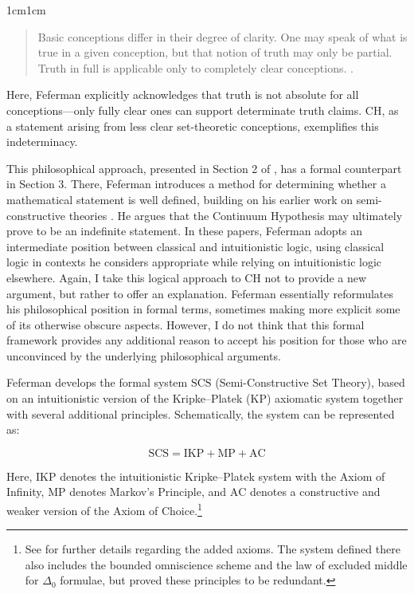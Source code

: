 \documentclass[11pt,a4paper]{book}
\theoremstyle{plain}
\begin{document}
\begin{adjustwidth}{1cm}{1cm}
\begin{quote}
\small
Basic conceptions differ in their degree of clarity. One may speak of what is true in a given conception, but that notion of truth may only be partial. Truth in full is applicable only to completely clear conceptions. \textcite[p. 11]{Feferman2011a}.
\end{quote}
\end{adjustwidth}

Here, Feferman explicitly acknowledges that truth is not absolute for all conceptions---only fully clear ones can support determinate truth claims. CH, as a statement arising from less clear set-theoretic conceptions, exemplifies this indeterminacy.

This philosophical approach, presented in Section 2 of \parencite{Feferman2011a}, has a formal counterpart in Section 3. There, Feferman introduces a method for determining whether a mathematical statement is well defined, building on his earlier work on semi-constructive theories \parencite{Feferman2010}. He argues that the Continuum Hypothesis may ultimately prove to be an indefinite statement. In these papers, Feferman adopts an intermediate position between classical and intuitionistic logic, using classical logic in contexts he considers appropriate while relying on intuitionistic logic elsewhere.
Again, I take this logical approach to CH not to provide a new argument, but rather to offer an explanation. Feferman essentially reformulates his philosophical position in formal terms, sometimes making more explicit some of its otherwise obscure aspects. However, I do not think that this formal framework provides any additional reason to accept his position for those who are unconvinced by the underlying philosophical arguments.

Feferman develops the formal system $\mathrm{SCS}$ (Semi-Constructive Set Theory), based on an intuitionistic version of the Kripke–Platek (KP) axiomatic system together with several additional principles. Schematically, the system can be represented as:

\begin{equation}
\mathrm{SCS} = \mathrm{IKP} + \mathrm{MP} + \mathrm{AC}
\end{equation}

Here, $\mathrm{IKP}$ denotes the intuitionistic Kripke–Platek system with the Axiom of Infinity, $\mathrm{MP}$ denotes Markov's Principle, and $\mathrm{AC}$ denotes a constructive and weaker version of the Axiom of Choice.\footnote{See \textcite[Section 6]{Feferman2010} for further details regarding the added axioms. The system defined there also includes the bounded omniscience scheme and the law of excluded middle for $\Delta_0$ formulae, but \textcite{Rathjen2016} proved these principles to be redundant.}
\end{document}
